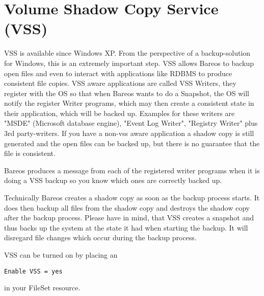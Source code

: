 \section{Volume Shadow Copy Service (VSS)}
\label{VSS}

VSS is available since Windows XP. From the perspective of
a backup-solution for Windows, this is an extremely important step. VSS
allows Bareos to backup open files and even to interact with applications like
RDBMS to produce consistent file copies. VSS aware applications are called
VSS Writers, they register with the OS so that when Bareos wants to do a
Snapshot, the OS will notify the register Writer programs, which may then
create a consistent state in their application, which will be backed up.
Examples for these writers are "MSDE" (Microsoft database
engine), "Event Log Writer", "Registry Writer" plus 3rd
party-writers.  If you have a non-vss aware application a shadow copy is still generated
and the open files can be backed up, but there is no guarantee
that the file is consistent.

Bareos produces a message from each of the registered writer programs
when it is doing a VSS backup so you know which ones are correctly backed
up.

Technically Bareos creates a shadow copy as soon as the backup process
starts. It does then backup all files from the shadow copy and destroys the
shadow copy after the backup process. Please have in mind, that VSS
creates a snapshot and thus backs up the system at the state it had
when starting the backup. It will disregard file changes which occur during
the backup process.

VSS can be turned on by placing an

\begin{verbatim}
Enable VSS = yes
\end{verbatim}

in your FileSet resource.

